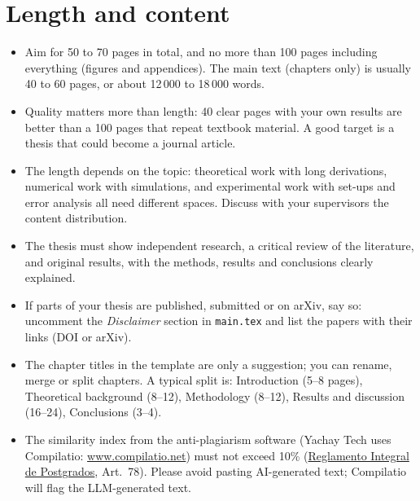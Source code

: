 \documentclass[a4paper,10pt,openany]{thesis}
\begin{document}
\section{Length and content}
\begin{itemize}
    \item Aim for 50 to 70 pages in total, and no more than 100 pages including everything (figures and appendices). The main text (chapters only) is usually 40 to 60 pages, or about 12\,000 to 18\,000 words.
    \item Quality matters more than length: 40 clear pages with your own results are better than a 100 pages that repeat textbook material. A good target is a thesis that could become a journal article.
    \item The length depends on the topic: theoretical work with long derivations, numerical work with simulations, and experimental work with set-ups and error analysis all need different spaces. Discuss with your supervisors the content distribution.
    \item The thesis must show independent research, a critical review of the literature, and original results, with the methods, results and conclusions clearly explained.
    \item If parts of your thesis are published, submitted or on arXiv, say so: uncomment the \textit{Disclaimer} section in \texttt{main.tex} and list the papers with their links (DOI or arXiv).
    \item The chapter titles in the template are only a suggestion; you can rename, merge or split chapters. A typical split is: Introduction (5--8 pages), Theoretical background (8--12), Methodology (8--12), Results and discussion (16--24), Conclusions (3--4).
    \item The similarity index from the anti-plagiarism software (Yachay Tech uses Compilatio: \href{https://www.compilatio.net}{www.compilatio.net}) must not exceed 10\% (\href{https://www.yachaytech.edu.ec/wp-content/uploads/2021/11/RCIFI-S0-011-No.-0320-2021-Reglamento-integral-de-postgrados.pdf}{Reglamento Integral de Postgrados}, Art.~78). Please avoid pasting AI-generated text; Compilatio will flag the LLM-generated text.
\end{itemize}

\end{document}
